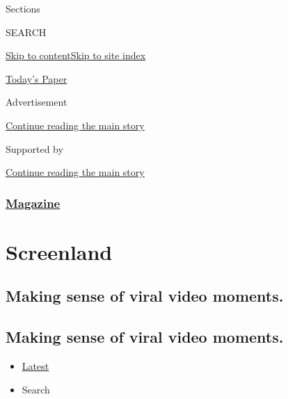Sections

SEARCH

\protect\hyperlink{site-content}{Skip to
content}\protect\hyperlink{site-index}{Skip to site index}

\href{https://myaccount.nytimes3xbfgragh.onion/auth/login?response_type=cookie\&client_id=vi}{}

\href{https://www.nytimes3xbfgragh.onion/section/todayspaper}{Today's
Paper}

Advertisement

\protect\hyperlink{after-top}{Continue reading the main story}

Supported by

\protect\hyperlink{after-sponsor}{Continue reading the main story}

\hypertarget{magazine}{%
\subsubsection{\texorpdfstring{\href{/section/magazine}{Magazine}}{Magazine}}\label{magazine}}

\hypertarget{screenland}{%
\section{Screenland}\label{screenland}}

\hypertarget{making-sense-of-viral-video-moments}{%
\subsection{Making sense of viral video
moments.}\label{making-sense-of-viral-video-moments}}

\hypertarget{making-sense-of-viral-video-moments-1}{%
\subsection{Making sense of viral video
moments.}\label{making-sense-of-viral-video-moments-1}}

\begin{itemize}
\tightlist
\item
  \protect\hyperlink{stream-panel}{Latest}
\item
  Search
\end{itemize}

